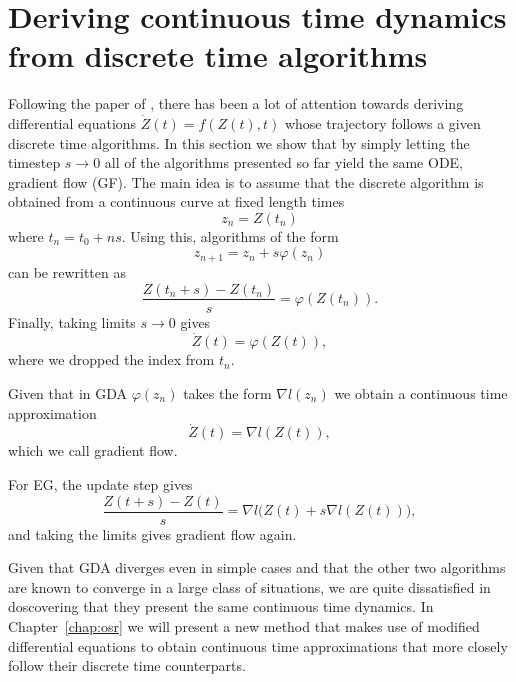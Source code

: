 \documentclass[main.tex]{subfiles}
\begin{document}
\section{Deriving continuous time dynamics from discrete time algorithms}
Following the paper of \cite{suDifferentialEquationModeling2016}, there has been a
lot of attention towards deriving differential equations $\dot Z(t) = f(Z(t),
	t)$ whose trajectory
follows a given discrete time algorithms.
In this section we show that by
simply letting the timestep $s \to 0$ all
of the algorithms presented so far yield the same ODE, gradient flow (GF).
The main idea is to assume that the discrete algorithm is obtained from
a continuous curve at fixed length times \[z_n = Z(t_n)\] where $t_n = t_0 + ns.$
Using this, algorithms of the form \[z_{n+1} = z_n + s\varphi(z_n)\] can
be rewritten as \[\frac{Z(t_n + s) - Z(t_n)}{s} = \varphi(Z(t_n)).\]
Finally, taking limits $s \to 0$ gives \[\dot Z(t) = \varphi(Z(t)),\] where
we dropped the index from $t_n.$
\begin{ex}
	Given that in GDA $\varphi(z_n)$ takes the form $\nabla l(z_n)$ we obtain a
	continuous time approximation \[\dot Z(t) = \nabla l(Z(t)),\] which we call gradient flow.
\end{ex}
\begin{ex}
    For EG, the update step gives \[\frac{Z(t + s) - Z(t)}{s} = \nabla l
    \big(Z(t) + s \nabla l(Z(t))\big),\]
    and taking the limits gives gradient flow again.
\end{ex}
 Given that GDA diverges even in simple cases and that the
other two algorithms are known to converge in a large class of situations, we
are quite dissatisfied in doscovering that they present the same continuous
time dynamics. 
In Chapter~\ref{chap:osr} we will present a new method that makes use of
modified differential equations to obtain continuous time approximations that
more closely follow their discrete time counterparts.
\end{document}
